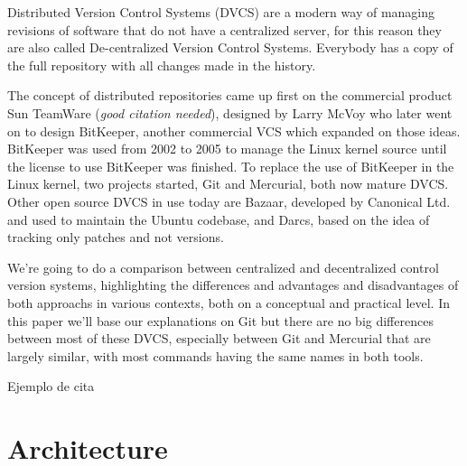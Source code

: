 \documentclass[%
	final,
	notitlepage,
	narroweqnarray,
	inline,
	twoside,
	]{ieee}
\begin{document}
Distributed Version Control Systems (DVCS) are a modern way of managing
revisions of software that do not have a centralized server, for this reason 
they are also called De-centralized Version Control Systems. Everybody has a 
copy of the full repository with all changes made in the history.

The concept of distributed repositories came up first on the commercial product 
Sun TeamWare (\emph{good citation needed}), designed by Larry McVoy who later went 
on to design BitKeeper, another commercial VCS which expanded on those ideas. 
BitKeeper was used from 2002 to 2005 to manage the Linux kernel source until 
the license to use BitKeeper was finished. 
To replace the use of BitKeeper in the Linux kernel, two projects started, Git and 
Mercurial, both now mature DVCS. Other open source DVCS in use today are Bazaar, 
developed by Canonical Ltd. and used to maintain the Ubuntu codebase, and Darcs, based on 
the idea of tracking only patches and not versions.


We're going to do a comparison between centralized and decentralized control version systems,
highlighting the differences and advantages and disadvantages of both approachs in various 
contexts, both on a conceptual and practical level. In this paper we'll base our explanations 
on Git but there are no big differences between 
most of these DVCS, especially between Git and Mercurial that are largely similar, with 
most commands having the same names in both tools.


Ejemplo de cita \cite{linusgit} 


\section{Architecture}
\end{document}
